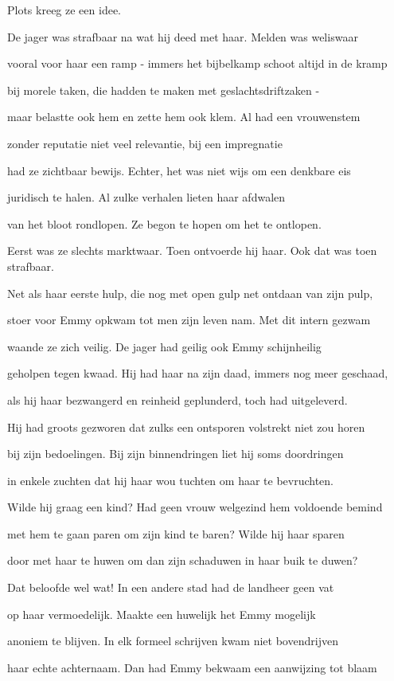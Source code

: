 Plots kreeg ze een idee.

De jager was strafbaar
na wat hij deed met haar.
Melden was weliswaar

vooral voor haar een ramp -
immers het bijbelkamp
schoot altijd in de kramp

bij morele taken,
die hadden te maken
met geslachtsdriftzaken -

maar belastte ook hem
en zette hem ook klem.
Al had een vrouwenstem

zonder reputatie
niet veel relevantie,
bij een impregnatie

had ze zichtbaar bewijs.
Echter, het was niet wijs
om een denkbare eis

juridisch te halen.
Al zulke verhalen
lieten haar afdwalen

van het bloot rondlopen.
Ze begon te hopen
om het te ontlopen.

Eerst was ze slechts marktwaar.
Toen ontvoerde hij haar.
Ook dat was toen strafbaar.

Net als haar eerste hulp,
die nog met open gulp
net ontdaan van zijn pulp,

stoer voor Emmy opkwam
tot men zijn leven nam.
Met dit intern gezwam

waande ze zich veilig.
De jager had geilig
ook Emmy schijnheilig

geholpen tegen kwaad.
Hij had haar na zijn daad,
immers nog meer geschaad,

als hij haar bezwangerd
en reinheid geplunderd,
toch had uitgeleverd.

Hij had groots gezworen
dat zulks een ontsporen
volstrekt niet zou horen

bij zijn bedoelingen.
Bij zijn binnendringen
liet hij soms doordringen

in enkele zuchten
dat hij haar wou tuchten
om haar te bevruchten.

Wilde hij graag een kind?
Had geen vrouw welgezind
hem voldoende bemind

met hem te gaan paren
om zijn kind te baren?
Wilde hij haar sparen

door met haar te huwen
om dan zijn schaduwen
in haar buik te duwen?

Dat beloofde wel wat!
In een andere stad
had de landheer geen vat

op haar vermoedelijk.
Maakte een huwelijk
het Emmy mogelijk

anoniem te blijven.
In elk formeel schrijven
kwam niet bovendrijven

haar echte achternaam.
Dan had Emmy bekwaam
een aanwijzing tot blaam

